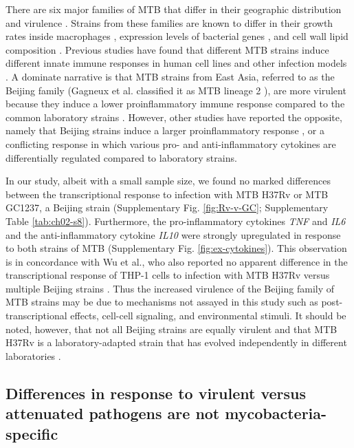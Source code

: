 There are six major families of MTB that differ in their geographic
distribution and virulence \citep{Gagneux2006, Comas2009}. Strains
from these families are known to differ in their growth rates inside
macrophages \citep{Li2002}, expression levels of bacterial genes
\citep{Homolka2010, Rose2013}, and cell wall lipid composition
\citep{Krishnan2011}. Previous studies have found that different MTB
strains induce different innate immune responses in human cell lines
and other infection models \citep{Coscolla2010}. A dominate narrative
is that MTB strains from East Asia, referred to as the Beijing family
(Gagneux et al. classified it as MTB lineage 2 \citep{Gagneux2006}),
are more virulent because they induce a lower proinflammatory immune
response compared to the common laboratory strains \citep{Manca2001,
  Manca2004, Reed2004, Tanveer2009, Wang2010}. However, other studies
have reported the opposite, namely that Beijing strains induce a
larger proinflammatory response \citep{Chacon-Salinas2005}, or a
conflicting response in which various pro- and anti-inflammatory
cytokines are differentially regulated \citep{Rocha-Ramirez2008,
  Koo2012} compared to laboratory strains.

In our study, albeit with a small sample size, we found no marked
differences between the transcriptional response to infection with MTB
H37Rv or MTB GC1237, a Beijing strain (Supplementary
Fig. \ref{fig:Rv-v-GC}; Supplementary Table
\ref{tab:ch02-s8}). Furthermore, the pro-inflammatory cytokines
\emph{TNF} and \emph{IL6} and the anti-inflammatory cytokine
\emph{IL10} were strongly upregulated in response to both strains of
MTB (Supplementary Fig. \ref{fig:ex-cytokines}). This observation is
in concordance with Wu et al., who also reported no apparent
difference in the transcriptional response of THP-1 cells to infection
with MTB H37Rv versus multiple Beijing strains \citep{Wu2012}. Thus
the increased virulence of the Beijing family of MTB strains may be
due to mechanisms not assayed in this study such as
post-transcriptional effects, cell-cell signaling, and environmental
stimuli. It should be noted, however, that not all Beijing strains are
equally virulent \citep{Dormans2004, Sinsimer2008} and that MTB H37Rv
is a laboratory-adapted strain that has evolved independently in
different laboratories \citep{Ioerger2010}.

\subsection{Differences in response to virulent versus attenuated
pathogens are not
mycobacteria-specific}\label{differences-in-response-to-virulent-versus-attenuated-pathogens-are-not-mycobacteria-specific}

